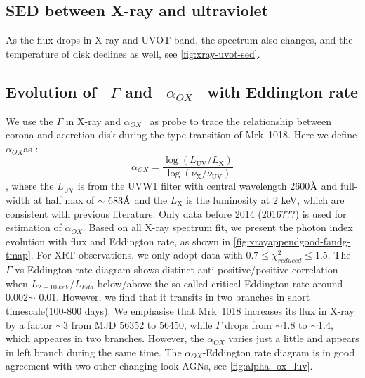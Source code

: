 \documentclass[twocolumn]{aastex63}
\newcommand{\alphaox}{$\alpha_{OX}$}
\newcommand{\xmm}{{\em XMM-Newton}}
\newcommand{\nustar}{{\em NuSTAR }}
\newcommand{\chandra}{{\em Chandra}}
\newcommand{\swift}{{\em Swift}}
\newcommand{\angstrom}{\text{\normalfont\AA}}
\begin{document}
\subsection{SED between X-ray and ultraviolet}\label{subsec:xray-uvot-sed}
As the flux drops in X-ray and UVOT band, the spectrum also changes, and the temperature of disk declines as well, see \autoref{fig:xray-uvot-sed}.













\subsection{Evolution of ~\texorpdfstring{$\Gamma$}. and ~\texorpdfstring{$\alpha_{OX}$}.~ with Eddington rate \label{subsec:g-f}}
We use the $\Gamma$ in X-ray and \alphaox ~ as probe to trace the relationship between corona and accretion disk during the type transition of Mrk~1018. Here we define \alphaox as :
\begin{equation}
\alpha_{OX} = \frac{\log (L_\mathrm{UV} / L_\mathrm{X} )} {\log (\nu_\mathrm{X} /  \nu_\mathrm{UV} )}\label{definition_alpha_ox}
\end{equation}
, where the $L_\mathrm{UV}$ is from the UVW1 filter with central wavelength {2600{$\angstrom$}} and full-width at half max of $\sim 683\angstrom$ \citep{2008MNRAS.383..627P} and the $L_\mathrm{X}$ is the luminosity at 2 keV, which are consistent with previous literature. Only data before 2014 (2016???) is used for estimation of $\alpha_{OX}$. Based on all X-ray spectrum fit, we present the photon index evolution with flux and Eddington rate, as shown in \autoref{fig:xrayappendgood-fandg-tmap}. For XRT observations, we only adopt data with 0.7$\le \chi^2_{reduced} \le$1.5. The $\Gamma$ vs Eddington rate diagram shows distinct anti-positive/positive correlation when $L_{2-10~ keV}/L_{Edd}$ below/above the so-called critical Eddington rate around 0.002$\sim$ 0.01. However, we find that it transits in two branches in short timescale(100-800 days). We emphasise that Mrk~1018 increases its flux in X-ray by a factor $\sim3$ from MJD 56352 to 56450, while $\Gamma$ drops from $\sim1.8$ to $\sim1.4$, which appeares in two branches. However, the $\alpha_{OX}$ varies just a little and appears in left branch during the same time. The $\alpha_{OX}$-Eddington rate diagram is in good agreement with two other changing-look AGNs, see \autoref{fig:alpha_ox_luv}. 
\end{document}
